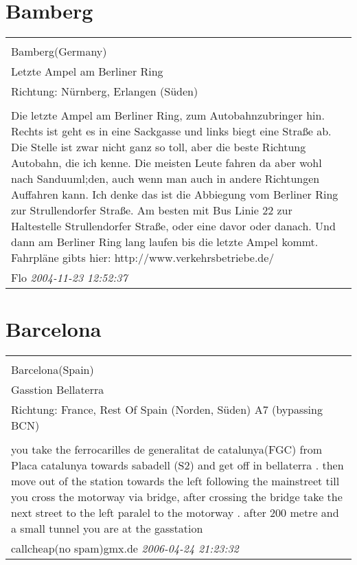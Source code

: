\documentclass[a4paper,12pt]{article}
\begin{document}
\section{Bamberg}
\begin{tabular}{|p{13cm}|}
\hline\\
Bamberg(Germany)\\
Letzte Ampel am Berliner Ring\\
Richtung: Nürnberg, Erlangen (Süden) \\
\hline\\
Die letzte Ampel am Berliner Ring, zum Autobahnzubringer hin. Rechts ist geht es in eine Sackgasse und links biegt eine Straße ab. Die Stelle ist zwar nicht ganz so toll, aber die beste Richtung Autobahn, die ich kenne. Die meisten Leute fahren da aber wohl nach Sanduuml;den, auch wenn man auch in andere Richtungen Auffahren kann. Ich denke das ist die Abbiegung vom Berliner Ring zur Strullendorfer Straße. Am besten mit Bus Linie 22 zur Haltestelle Strullendorfer Straße, oder eine davor oder danach. Und dann am Berliner Ring lang laufen bis die letzte Ampel kommt. Fahrpläne gibts hier: http://www.verkehrsbetriebe.de/ \\
Flo \textit{ 2004-11-23 12:52:37 }\\\hline
\end{tabular}


\section{Barcelona}
\begin{tabular}{|p{13cm}|}
\hline\\
Barcelona(Spain)\\
Gasstion Bellaterra\\
Richtung: France, Rest Of Spain (Norden, Süden) A7 (bypassing BCN) \\
\hline\\
you take the ferrocarilles de generalitat de catalunya(FGC) from Placa catalunya towards sabadell (S2) and get off in bellaterra . then move out of the station towards the left following the mainstreet till you cross the motorway via bridge, after crossing the bridge take the next street to the left paralel to the motorway . after 200 metre and a small tunnel you are at the gasstation \\
callcheap(no spam)gmx.de \textit{ 2006-04-24 21:23:32 }\\\hline
\end{tabular}
\end{document}
